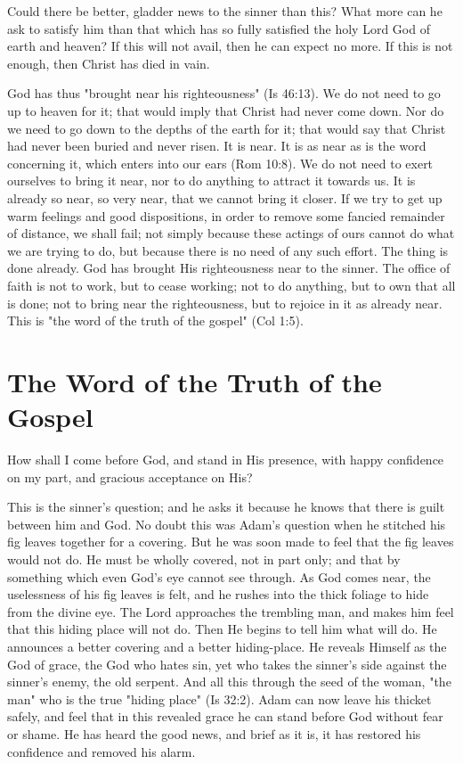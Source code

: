 \documentclass[
]{book}
\begin{document}
Could there be better, gladder news to the sinner than this? What more can he ask to satisfy him than that which has so fully satisfied the holy Lord God of earth and heaven? If this will not avail, then he can expect no more. If this is not enough, then Christ has died in vain.

God has thus "brought near his righteousness" (Is 46:13). We do not need to go up to heaven for it; that would imply that Christ had never come down. Nor do we need to go down to the depths of the earth for it; that would say that Christ had never been buried and never risen. It is near. It is as near as is the word concerning it, which enters into our ears (Rom 10:8). We do not need to exert ourselves to bring it near, nor to do anything to attract it towards us. It is already so near, so very near, that we cannot bring it closer. If we try to get up warm feelings and good dispositions, in order to remove some fancied remainder of distance, we shall fail; not simply because these actings of ours cannot do what we are trying to do, but because there is no need of any such effort. The thing is done already. God has brought His righteousness near to the sinner. The office of faith is not to work, but to cease working; not to do anything, but to own that all is done; not to bring near the righteousness, but to rejoice in it as already near. This is "the word of the truth of the gospel" (Col 1:5).

\hypertarget{the-word-of-the-truth-of-the-gospel}{%
\chapter{The Word of the Truth of the Gospel}\label{the-word-of-the-truth-of-the-gospel}}

How shall I come before God, and stand in His presence, with happy confidence on my part, and gracious acceptance on His?

This is the sinner's question; and he asks it because he knows that there is guilt between him and God. No doubt this was Adam's question when he stitched his fig leaves together for a covering. But he was soon made to feel that the fig leaves would not do. He must be wholly covered, not in part only; and that by something which even God's eye cannot see through. As God comes near, the uselessness of his fig leaves is felt, and he rushes into the thick foliage to hide from the divine eye. The Lord approaches the trembling man, and makes him feel that this hiding place will not do. Then He begins to tell him what will do. He announces a better covering and a better hiding-place. He reveals Himself as the God of grace, the God who hates sin, yet who takes the sinner's side against the sinner's enemy, the old serpent. And all this through the seed of the woman, "the man" who is the true "hiding place" (Is 32:2). Adam can now leave his thicket safely, and feel that in this revealed grace he can stand before God without fear or shame. He has heard the good news, and brief as it is, it has restored his confidence and removed his alarm.
\end{document}
